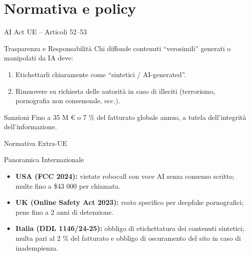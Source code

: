 \documentclass[12pt]{beamer}
\begin{document}
\section{Normativa e policy}
\begin{frame}{AI Act UE – Articoli 52–53}
  \begin{alertblock}{Trasparenza e Responsabilità}
    Chi diffonde contenuti “verosimili” generati o manipolati da IA deve:
    \begin{enumerate}
      \item Etichettarli chiaramente come “sintetici / AI-generated”.
      \item Rimuovere su richiesta delle autorità in caso di illeciti (terrorismo, pornografia non consensuale, ecc.).
    \end{enumerate}
  \end{alertblock}
  \begin{alertblock}{Sanzioni}
    Fino a 35 M € o 7 \% del fatturato globale annuo, a tutela dell’integrità dell’informazione.
  \end{alertblock}
\end{frame}

\begin{frame}{Normativa Extra-UE}
  \small
  \begin{alertblock}{Panoramica Internazionale}
    \begin{itemize}
      \item \textbf{USA (FCC 2024):} vietate robocall con voce AI senza consenso scritto; multe fino a \$43 000 per chiamata.\cite{fcc_voice_2024}
      \item \textbf{UK (Online Safety Act 2023):} reato specifico per deepfake pornografici; pene fino a 2 anni di detenzione.
      \item \textbf{Italia (DDL 1146/24-25):} obbligo di etichettatura dei contenuti sintetici; multa pari al 2 \% del fatturato e obbligo di oscuramento del sito in caso di inadempienza.\cite{senato_ddl1146}
    \end{itemize}
  \end{alertblock}
\end{frame}


\end{document}
